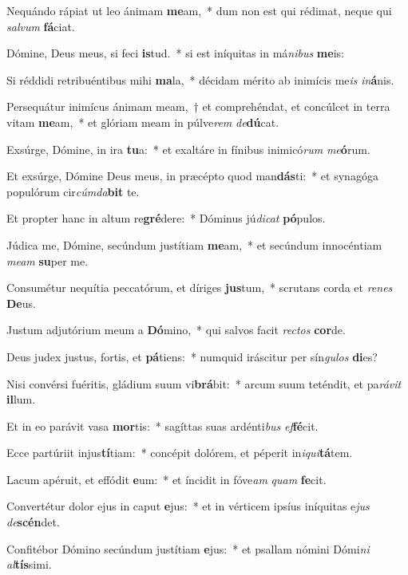 \item Nequándo rápiat ut leo ánimam \textbf{me}am,~* dum non est qui rédimat, neque qui \textit{sal}\textit{vum} \textbf{fá}ciat.
\item Dómine, Deus meus, si feci \textbf{is}tud.~* si est iníquitas in má\textit{ni}\textit{bus} \textbf{me}is:
\item Si réddidi retribuéntibus mihi \textbf{ma}la,~* décidam mérito ab inimícis me\textit{is} \textit{in}\textbf{á}nis.
\item Persequátur inimícus ánimam meam,~† et comprehéndat, et concúlcet in terra vitam \textbf{me}am,~* et glóriam meam in púlve\textit{rem} \textit{de}\textbf{dú}cat.
\item Exsúrge, Dómine, in ira \textbf{tu}a:~* et exaltáre in fínibus inimicó\textit{rum} \textit{me}\textbf{ó}rum.
\item Et exsúrge, Dómine Deus meus, in præcépto quod man\textbf{dás}ti:~* et synagóga populórum cir\textit{cúm}\textit{da}\textbf{bit} te.
\item Et propter hanc in altum re\textbf{gré}dere:~* Dóminus jú\textit{di}\textit{cat} \textbf{pó}pulos.
\item Júdica me, Dómine, secúndum justítiam \textbf{me}am,~* et secúndum innocéntiam \textit{me}\textit{am} \textbf{su}per me.
\item Consumétur nequítia peccatórum, et díriges \textbf{jus}tum,~* scrutans corda et \textit{re}\textit{nes} \textbf{De}us.
\item Justum adjutórium meum a \textbf{Dó}mino,~* qui salvos facit \textit{rec}\textit{tos} \textbf{cor}de.
\item Deus judex justus, fortis, et \textbf{pá}tiens:~* numquid iráscitur per sín\textit{gu}\textit{los} \textbf{di}es?
\item Nisi convérsi fuéritis, gládium suum vi\textbf{brá}bit:~* arcum suum teténdit, et pa\textit{rá}\textit{vit} \textbf{il}lum.
\item Et in eo parávit vasa \textbf{mor}tis:~* sagíttas suas ardénti\textit{bus} \textit{ef}\textbf{fé}cit.
\item Ecce partúriit injus\textbf{tí}tiam:~* concépit dolórem, et péperit in\textit{i}\textit{qui}\textbf{tá}tem.
\item Lacum apéruit, et effódit \textbf{e}um:~* et íncidit in fóve\textit{am} \textit{quam} \textbf{fe}cit.
\item Convertétur dolor ejus in caput \textbf{e}jus:~* et in vérticem ipsíus iníquitas e\textit{jus} \textit{de}\textbf{scén}det.
\item Confitébor Dómino secúndum justítiam \textbf{e}jus:~* et psallam nómini Dómi\textit{ni} \textit{al}\textbf{tís}simi.
